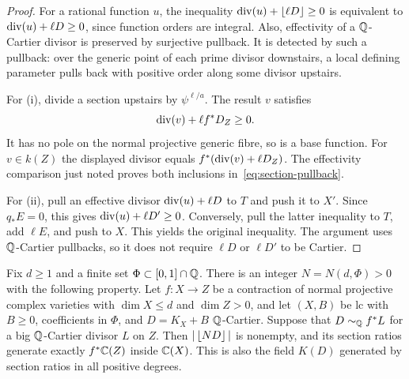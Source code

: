 \begin{proof}
For a rational function $u$, the inequality
$\operatorname{div}(u)+\left\lfloor \ell D\right\rfloor\geq0$ is equivalent to
$\operatorname{div}(u)+\ell D\geq0$, since function orders are integral.
Also, effectivity of a $\mathbb Q$-Cartier divisor is preserved by surjective
pullback.  It is detected by such a pullback: over the generic point of
each prime divisor downstairs, a local defining parameter pulls back
with positive order along some divisor upstairs.

For (i), divide a section upstairs by $\psi^{\ell/a}$.  The result
$v$ satisfies
\[
 \operatorname{div}(v)+\ell f^*D_Z\geq0.
\]
It has no pole on the normal projective generic fibre, so is a base
function.  For $v\in k(Z)$ the displayed divisor equals
$f^*(\operatorname{div}(v)+\ell D_Z)$.  The effectivity comparison just noted proves
both inclusions in~\eqref{eq:section-pullback}.

For (ii), pull an effective divisor $\operatorname{div}(u)+\ell D$ to $T$ and push
it to $X'$.  Since $q_*E=0$, this gives
$\operatorname{div}(u)+\ell D'\geq0$.  Conversely, pull the latter inequality to
$T$, add $\ell E$, and push to $X$.  This yields the original
inequality.  The argument uses $\mathbb Q$-Cartier pullbacks, so it does not
require $\ell D$ or $\ell D'$ to be Cartier.
\end{proof}

\begin{proposition}
\label{prop:effective-fibration}
Fix $d\geq1$ and a finite set $\Phi\subset[0,1]\cap\mathbb Q$.
There is an integer $N=N(d,\Phi)>0$ with the following property.
Let $f:X\to Z$ be a contraction of normal projective complex varieties
with $\dim X\leq d$ and $\dim Z>0$, and let $(X,B)$ be lc with
$B\geq0$, coefficients in $\Phi$, and $D=K_X+B$ $\mathbb Q$-Cartier.
Suppose that $D\sim_{\mathbb Q} f^*L$ for a big $\mathbb Q$-Cartier divisor $L$ on $Z$.
Then $|\left\lfloor ND\right\rfloor|$ is nonempty, and its section ratios generate
exactly $f^*\mathbb C(Z)$ inside $\mathbb C(X)$.  This is also the field $K(D)$
generated by section ratios in all positive degrees.
\end{proposition}

